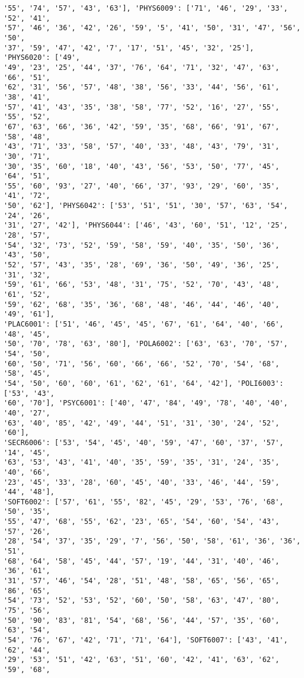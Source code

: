 \documentclass[11pt]{article}
\begin{document}
\begin{Verbatim}[commandchars=\\\{\}]
'55', '74', '57', '43', '63'], 'PHYS6009': ['71', '46', '29', '33', '52', '41',
'57', '46', '36', '42', '26', '59', '5', '41', '50', '31', '47', '56', '50',
'37', '59', '47', '42', '7', '17', '51', '45', '32', '25'], 'PHYS6020': ['49',
'49', '23', '25', '44', '37', '76', '64', '71', '32', '47', '63', '66', '51',
'62', '31', '56', '57', '48', '38', '56', '33', '44', '56', '61', '38', '41',
'57', '41', '43', '35', '38', '58', '77', '52', '16', '27', '55', '55', '52',
'67', '63', '66', '36', '42', '59', '35', '68', '66', '91', '67', '58', '48',
'43', '71', '33', '58', '57', '40', '33', '48', '43', '79', '31', '30', '71',
'30', '35', '60', '18', '40', '43', '56', '53', '50', '77', '45', '64', '51',
'55', '60', '93', '27', '40', '66', '37', '93', '29', '60', '35', '41', '72',
'50', '62'], 'PHYS6042': ['53', '51', '51', '30', '57', '63', '54', '24', '26',
'31', '27', '42'], 'PHYS6044': ['46', '43', '60', '51', '12', '25', '28', '57',
'54', '32', '73', '52', '59', '58', '59', '40', '35', '50', '36', '43', '50',
'52', '57', '43', '35', '28', '69', '36', '50', '49', '36', '25', '31', '32',
'59', '61', '66', '53', '48', '31', '75', '52', '70', '43', '48', '61', '52',
'59', '62', '68', '35', '36', '68', '48', '46', '44', '46', '40', '49', '61'],
'PLAC6001': ['51', '46', '45', '45', '67', '61', '64', '40', '66', '48', '45',
'50', '70', '78', '63', '80'], 'POLA6002': ['63', '63', '70', '57', '54', '50',
'60', '50', '71', '56', '60', '66', '66', '52', '70', '54', '68', '58', '45',
'54', '50', '60', '60', '61', '62', '61', '64', '42'], 'POLI6003': ['53', '43',
'60', '70'], 'PSYC6001': ['40', '47', '84', '49', '78', '40', '40', '40', '27',
'63', '40', '85', '42', '49', '44', '51', '31', '30', '24', '52', '60'],
'SECR6006': ['53', '54', '45', '40', '59', '47', '60', '37', '57', '14', '45',
'63', '53', '43', '41', '40', '35', '59', '35', '31', '24', '35', '40', '66',
'23', '45', '33', '28', '60', '45', '40', '33', '46', '44', '59', '44', '48'],
'SOFT6002': ['57', '61', '55', '82', '45', '29', '53', '76', '68', '50', '35',
'55', '47', '68', '55', '62', '23', '65', '54', '60', '54', '43', '57', '26',
'28', '54', '37', '35', '29', '7', '56', '50', '58', '61', '36', '36', '51',
'68', '64', '58', '45', '44', '57', '19', '44', '31', '40', '46', '36', '61',
'31', '57', '46', '54', '28', '51', '48', '58', '65', '56', '65', '86', '65',
'54', '73', '52', '53', '52', '60', '50', '58', '63', '47', '80', '75', '56',
'50', '90', '83', '81', '54', '68', '56', '44', '57', '35', '60', '63', '54',
'54', '76', '67', '42', '71', '71', '64'], 'SOFT6007': ['43', '41', '62', '44',
'29', '53', '51', '42', '63', '51', '60', '42', '41', '63', '62', '59', '68',

\end{Verbatim}
\end{document}
